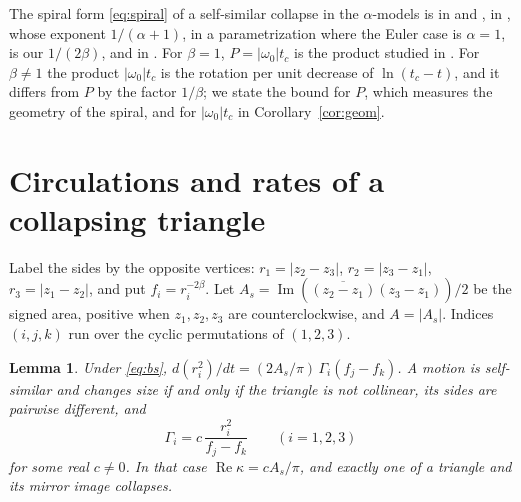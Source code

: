 \documentclass[11pt]{article}
\newtheorem{lemma}{Lemma}
\theoremstyle{definition}
\newcommand{\re}{\operatorname{Re}}
\newcommand{\im}{\operatorname{Im}}
\begin{document}
The spiral form \eqref{eq:spiral} of a self-similar collapse in the $\alpha$-models is in \cite{yoi2021} and \cite[Eqs.~(3)--(6)]{iy2023}, in \cite[(A.19)]{dgc2023}, whose exponent $1/(\alpha + 1)$, in a parametrization where the Euler case is $\alpha = 1$, is our $1/(2\beta)$, and in \cite[Prop.~2.1]{gp2025}. For $\beta = 1$, $P = |\omega_0| t_c$ is the product studied in \cite{hendrick2026}. For $\beta \ne 1$ the product $|\omega_0| t_c$ is the rotation per unit decrease of $\ln(t_c - t)$, and it differs from $P$ by the factor $1/\beta$; we state the bound for $P$, which measures the geometry of the spiral, and for $|\omega_0| t_c$ in Corollary~\ref{cor:geom}.

\section{Circulations and rates of a collapsing triangle}\label{sec:rates}

Label the sides by the opposite vertices: $r_1 = |z_2 - z_3|$, $r_2 = |z_3 - z_1|$, $r_3 = |z_1 - z_2|$, and put $f_i = r_i^{-2\beta}$. Let $A_s = \im(\overline{(z_2 - z_1)}(z_3 - z_1))/2$ be the signed area, positive when $z_1, z_2, z_3$ are counterclockwise, and $A = |A_s|$. Indices $(i, j, k)$ run over the cyclic permutations of $(1, 2, 3)$.

\begin{lemma}\label{lem:circ}
Under \eqref{eq:bs}, $d(r_i^2)/dt = (2A_s/\pi)\,\Gamma_i (f_j - f_k)$. A motion is self-similar and changes size if and only if the triangle is not collinear, its sides are pairwise different, and
\begin{equation}\label{eq:circ}
\Gamma_i = c\, \frac{r_i^2}{f_j - f_k} \qquad (i = 1, 2, 3)
\end{equation}
for some real $c \ne 0$. In that case $\re\kappa = cA_s/\pi$, and exactly one of a triangle and its mirror image collapses.
\end{lemma}
\end{document}
